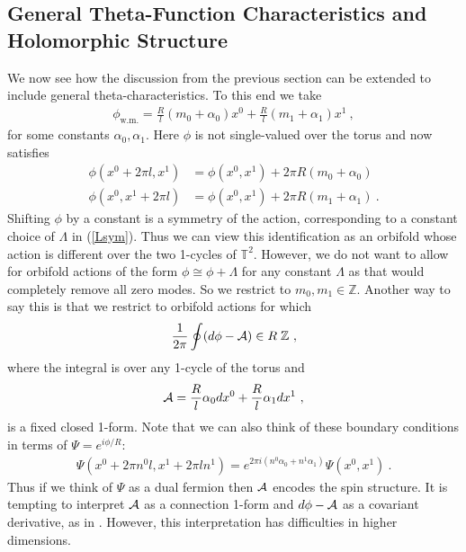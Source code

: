 \documentclass[11pt]{article}
\numberwithin{equation}{section}
\begin{document}
\subsection{General Theta-Function Characteristics and  Holomorphic Structure}\label{general}

We now see how the discussion from the previous section can be extended to include general theta-characteristics.
To this end we take
\begin{align}
\phi_{\text{w.m.}} = \frac{R}{l}(m_0+\alpha_0)x^0 + 	\frac{R}{l}(m_1+\alpha_1)x^1\ ,
\end{align}
for some constants $\alpha_0,\alpha_1$. Here $\phi$ is not single-valued over the torus  and now satisfies
\begin{align}
\phi(x^0+2\pi l,x^1) &= \phi(x^0,x^1) + 2\pi R(m_0+\alpha_0)\nonumber\\ 	
\phi(x^0,x^1+2\pi l) &= \phi(x^0,x^1) + 2\pi R(m_1+\alpha_1)\ .
\end{align}
Shifting $\phi$ by a constant is a symmetry of the action, corresponding to a constant choice of $\Lambda$ in (\ref{Lsym}). Thus we can view this identification as an orbifold whose action is different over the two 1-cycles of $\mathbb T^2$. However, we do not want to allow for orbifold actions of the form $\phi \cong \phi + \Lambda$ for any constant $\Lambda$ as that would completely remove all zero modes. So we restrict to $m_0,m_1\in \mathbb Z$. Another way to say this is that we restrict to orbifold actions for which
\begin{align}
	\frac{1}{2\pi}\oint (d\phi - {\cal A})\in R\;{\mathbb Z}\ ,
\end{align} 
where the integral is over any 1-cycle of the torus and 
\begin{align}
{\cal A} = \frac{R}{l}\alpha_0dx^0+\frac{R}{l}\alpha_1 dx^1	\ ,
\end{align}
is a fixed closed 1-form. Note that we can also think of these boundary conditions in terms of  $\Psi= e^{i\phi/R}$:
\begin{align}
\Psi(x^0+2\pi n^0 l,x^1+ 2\pi l n^1)    = e^{2\pi i (n^0\alpha_0+n^1\alpha_1)}\Psi(x^0,x^1) \ .
\end{align}
Thus if we think of $\Psi$ as a dual fermion then ${\cal A}$ encodes the spin structure. It is tempting to interpret ${\cal A}$ as a connection 1-form and $d\phi-{\cal A}$ as a covariant derivative, as in \cite{Witten:1996hc}. However, this interpretation has difficulties in higher dimensions.
\end{document}
